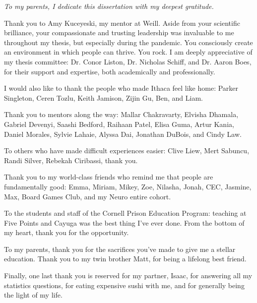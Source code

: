 \documentclass[phd,tocprelim]{cornell}
\begin{document}
\begin{dedication}
\textit{To my parents, I dedicate this dissertation with my deepest gratitude. }

\end{dedication}

\begin{acknowledgements}
Thank you to Amy Kuceyeski, my mentor at Weill. Aside from your  scientific brilliance, your compassionate and trusting leadership was invaluable to me throughout my thesis, but especially during the pandemic.  You consciously create an environment in which people can  thrive. You rock. I am deeply appreciative of my thesis committee: Dr. Conor Liston, Dr. Nicholas Schiff, and Dr. Aaron Boes, for their support and expertise, both academically and professionally.

I would also like to thank the people who made Ithaca feel like home:  Parker Singleton, Ceren Tozlu, Keith Jamison, Zijin Gu, Ben, and Liam.

Thank you to mentors along the way: Mallar Chakravarty, Elvisha Dhamala, Gabriel Devenyi, Saashi Bedford, Raihaan Patel,  Elisa Guma, Artur Kania,  Daniel Morales, Sylvie Lahaie, Alyssa Dai,  Jonathan DuBois,  and Cindy Law.

To others who have made difficult experiences easier: Clive Liew, Mert Sabuncu, Randi Silver, Rebekah Ciribassi, thank you.

Thank you to my world-class friends who remind me that people are fundamentally good: Emma, Miriam, Mikey, Zoe, Nilasha, Jonah, CEC, Jasmine, Max, Board Games Club, and my Neuro entire cohort.

To the students and staff of the Cornell Prison Education Program: teaching at Five Points and Cayuga was the best thing I've ever done. From the bottom of my heart, thank you for the opportunity.

To my parents, thank you for the sacrifices you’ve made to
give me a stellar education. Thank you to my twin brother Matt, for being a lifelong best friend.

Finally, one last thank you is reserved for my partner, Isaac,  for answering all my statistics questions, for eating expensive sushi with me, and for generally being the light of my life.
\end{acknowledgements}

\contentspage
\tablelistpage
\figurelistpage

\normalspacing \setcounter{page}{1} 
\pagestyle{cornell} \addtolength{\parskip}{0.5\baselineskip}
\end{document}
